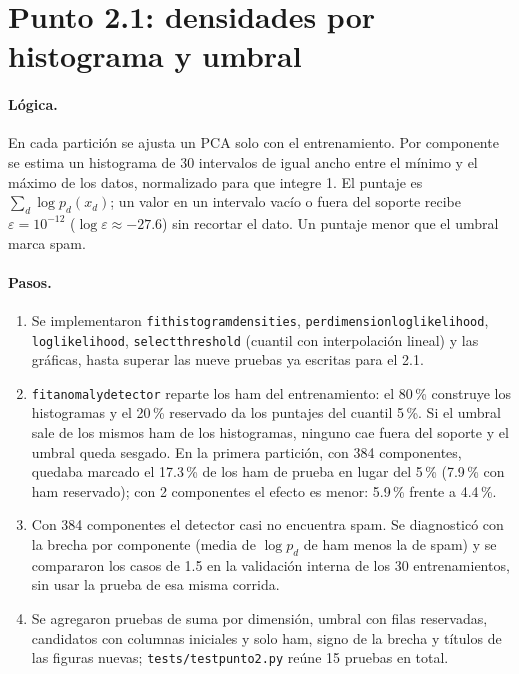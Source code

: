 \documentclass[11pt,letterpaper]{article}
\renewcommand{\_}{\originalunderscore\allowbreak}
\begin{document}
\section{Punto 2.1: densidades por histograma y umbral}
\label{sec:review-punto21}
\paragraph{Lógica.} En cada partición se ajusta un PCA solo con el
entrenamiento. Por componente se estima un histograma de 30 intervalos de
igual ancho entre el mínimo y el máximo de los datos, normalizado para que
integre 1. El puntaje es $\sum_d\log p_d(x_d)$; un valor en un intervalo vacío
o fuera del soporte recibe $\varepsilon=10^{-12}$ ($\log\varepsilon\approx-27.6$)
sin recortar el dato. Un puntaje menor que el umbral marca spam.

\paragraph{Pasos.}
\begin{enumerate}
\item Se implementaron \texttt{fit\_histogram\_densities},
\texttt{per\_dimension\_log\_likelihood}, \texttt{log\_likelihood},
\texttt{select\_threshold} (cuantil con interpolación lineal) y las gráficas,
hasta superar las nueve pruebas ya escritas para el 2.1.
\item \texttt{fit\_anomaly\_detector} reparte los ham del entrenamiento: el
80\,\% construye los histogramas y el 20\,\% reservado da los puntajes del
cuantil 5\,\%. Si el umbral sale de los mismos ham de los histogramas, ninguno
cae fuera del soporte y el umbral queda sesgado. En la primera partición, con
384 componentes, quedaba marcado el 17.3\,\% de los ham de prueba en lugar del
5\,\% (7.9\,\% con ham reservado); con 2 componentes el efecto es menor: 5.9\,\%
frente a 4.4\,\%.
\item Con 384 componentes el detector casi no encuentra spam. Se diagnosticó
con la brecha por componente (media de $\log p_d$ de ham menos la de spam) y
se compararon los casos de 1.5 en la validación interna de los 30
entrenamientos, sin usar la prueba de esa misma corrida.
\item Se agregaron pruebas de suma por dimensión, umbral con filas
reservadas, candidatos con columnas iniciales y solo ham, signo de la brecha
y títulos de las figuras nuevas; \texttt{tests/test\_punto2.py} reúne 15
pruebas en total.
\end{enumerate}
\end{document}
